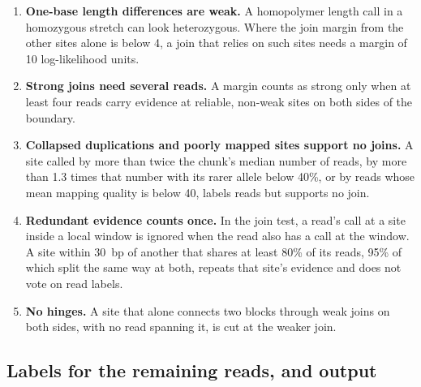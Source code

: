 \begin{enumerate}
  \item \textbf{One-base length differences are weak.} A homopolymer length call in a homozygous stretch can look heterozygous. Where the join margin from the other sites alone is below 4, a join that relies on such sites needs a margin of 10 log-likelihood units.
  \item \textbf{Strong joins need several reads.} A margin counts as strong only when at least four reads carry evidence at reliable, non-weak sites on both sides of the boundary.
  \item \textbf{Collapsed duplications and poorly mapped sites support no joins.} A site called by more than twice the chunk's median number of reads, by more than 1.3 times that number with its rarer allele below 40\%, or by reads whose mean mapping quality is below 40, labels reads but supports no join.
  \item \textbf{Redundant evidence counts once.} In the join test, a read's call at a site inside a local window is ignored when the read also has a call at the window. A site within 30~bp of another that shares at least 80\% of its reads, 95\% of which split the same way at both, repeats that site's evidence and does not vote on read labels.
  \item \textbf{No hinges.} A site that alone connects two blocks through weak joins on both sides, with no read spanning it, is cut at the weaker join.
\end{enumerate}

\subsection{Labels for the remaining reads, and output}

